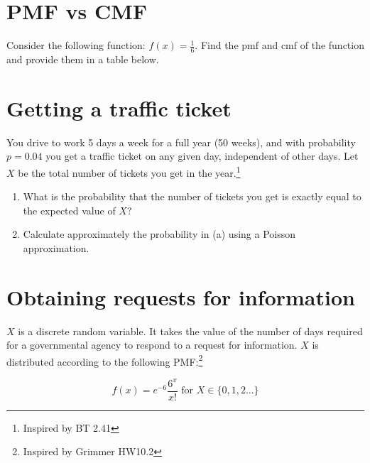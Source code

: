 \documentclass[
]{article}
\begin{document}
\section{PMF vs CMF}\label{pmf-vs-cmf}

Consider the following function: \(f(x) = \frac{1}{6}\). Find the pmf
and cmf of the function and provide them in a table below.

\hfill\break
\hfill\break
\hfill\break
\hfill\break
\hfill\break
\hfill\break
\hfill\break

\section{Getting a traffic ticket}\label{getting-a-traffic-ticket}

You drive to work 5 days a week for a full year (50 weeks), and with
probability \(p=0.04\) you get a traffic ticket on any given day,
independent of other days. Let \(X\) be the total number of tickets you
get in the year.\footnote{Inspired by BT 2.41}

\begin{enumerate}
\def\labelenumi{\alph{enumi}.}
\item
  What is the probability that the number of tickets you get is exactly
  equal to the expected value of \(X\)?
\item
  Calculate approximately the probability in (a) using a Poisson
  approximation.
\end{enumerate}

\hfill\break
\hfill\break
\hfill\break
\hfill\break
\hfill\break
\hfill\break
\hfill\break

\section{Obtaining requests for
information}\label{obtaining-requests-for-information}

\(X\) is a discrete random variable. It takes the value of the number of
days required for a governmental agency to respond to a request for
information. \(X\) is distributed according to the following
PMF:\footnote{Inspired by Grimmer HW10.2}

\[f(x) = e^{-6} \dfrac{6^x}{x!} \mbox{ for } X \in \{0,1,2...\}\]
\end{document}
